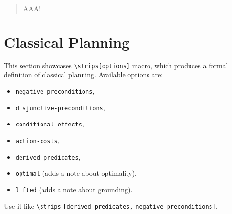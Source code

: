 %
%
%
%
%
%
%
%
%
%
%
%
\begin{abstract}
AAA!
\end{abstract}




\section{Classical Planning}
This section showcases \verb`\strips[options]` macro, which produces a formal definition of classical planning.
Available options are:
\begin{itemize}
 \item \texttt{negative-preconditions},
 \item \texttt{disjunctive-preconditions},
 \item \texttt{conditional-effects},
 \item \texttt{action-costs},
 \item \texttt{derived-predicates},
 \item \texttt{optimal} (adds a note about optimality),
 \item \texttt{lifted} (adds a note about grounding).
\end{itemize}
Use it like \verb`\strips` \texttt{[derived-predicates,} \texttt{negative-preconditions]}.

